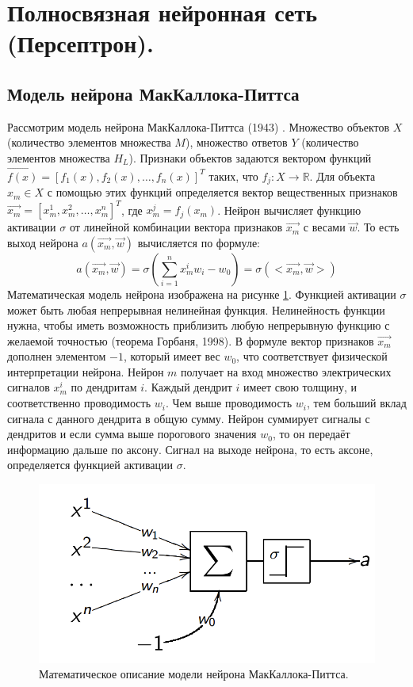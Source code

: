 \section{Полносвязная нейронная сеть (Персептрон).}

\subsection{Модель нейрона МакКаллока-Питтса}

Рассмотрим модель нейрона МакКаллока-Питтса (1943) \cite{ModelMcCullochPitts}. Множество объектов $X$ (количество элементов множества $M$), множество ответов $Y$ (количество элементов множества $H_L$). Признаки объектов задаются вектором функций $\overrightarrow{f(x)} = [f_1(x), f_2(x), \dots, f_n(x)]^T$ таких, что $f_j: X \rightarrow \mathbb{R}$. Для объекта $x_m \in X$ с помощью этих функций определяется вектор вещественных признаков $\overrightarrow{x_m} = [x_m^1, x_m^2, \dots, x_m^n]^T$, где $x_m^j = f_j (x_m)$. Нейрон вычисляет функцию активации $\sigma$ от линейной комбинации вектора признаков $\overrightarrow{x_m}$ с весами $\overrightarrow{w}$. То есть выход нейрона $a(\overrightarrow{x_m}, \overrightarrow{w})$ вычисляется по формуле:
$$
a(\overrightarrow{x_m}, \overrightarrow{w}) = \sigma(\sum_{i = 1}^{n} x_m^i w_i - w_0) = \sigma (<\overrightarrow{x_m}, \overrightarrow{w}>)
$$
Математическая модель нейрона изображена на рисунке \ref{img:McCullochPittsModel}. Функцией активации $\sigma$ может быть любая непрерывная нелинейная функция. Нелинейность функции нужна, чтобы иметь возможность приблизить любую непрерывную функцию с желаемой точностью (теорема Горбаня, 1998). В формуле вектор признаков $\overrightarrow{x_m}$ дополнен элементом $-1$, который имеет вес $w_0$, что соответствует физической интерпретации нейрона. Нейрон $m$ получает на вход множество электрических сигналов $x_m^i$ по дендритам $i$. Каждый дендрит $i$ имеет свою толщину, и соответственно проводимость $w_i$. Чем выше проводимость $w_i$, тем больший вклад сигнала с данного дендрита в общую сумму. Нейрон суммирует сигналы с дендритов и если сумма выше порогового значения $w_0$, то он передаёт информацию дальше по аксону. Сигнал на выходе нейрона, то есть аксоне, определяется функцией активации $\sigma$.

\begin{figure}[h]
	\centering
	\includegraphics[width=0.4\linewidth]{chapters/neural/images/neuron1.png}
	\caption{Математическое описание модели нейрона МакКаллока-Питтса.}
	\label{img:McCullochPittsModel}
\end{figure}


